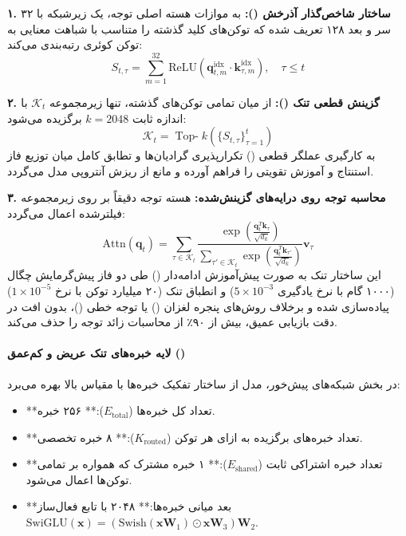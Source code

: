 \textbf{۱. ساختار شاخص‌گذار آذرخش ():}
به موازات هسته اصلی توجه، یک زیرشبکه با ۳۲ سر و بعد ۱۲۸ تعریف شده که توکن‌های کلید گذشته را متناسب با شباهت معنایی به توکن کوئری رتبه‌بندی می‌کند:
\begin{equation}
    S_{t, \tau} = \sum_{m=1}^{32} \text{ReLU}\left( \mathbf{q}_{t, m}^{\text{idx}} \cdot \mathbf{k}_{\tau, m}^{\text{idx}} \right), \quad \tau \le t
\end{equation}

\textbf{۲. گزینش قطعی تنک ():}
از میان تمامی توکن‌های گذشته، تنها زیرمجموعه $\mathcal{K}_t$ با اندازه ثابت $k=2048$ برگزیده می‌شود:
\begin{equation}
    \mathcal{K}_t = \operatorname{Top-}k\left( \{ S_{t, \tau} \}_{\tau=1}^t \right)
\end{equation}
به کارگیری عملگر قطعی  () تکرارپذیری گرادیان‌ها و تطابق کامل میان توزیع فاز استنتاج و آموزش تقویتی را فراهم آورده و مانع از ریزش آنتروپی مدل می‌گردد.

\textbf{۳. محاسبه توجه روی درایه‌های گزینش‌شده:}
هسته توجه دقیقاً بر روی زیرمجموعه فیلترشده اعمال می‌گردد:
\begin{equation}
    \text{Attn}(\mathbf{q}_t) = \sum_{\tau \in \mathcal{K}_t} \frac{\exp\left( \frac{\mathbf{q}_t^T \mathbf{k}_\tau}{\sqrt{d_k}} \right)}{\sum_{\tau' \in \mathcal{K}_t} \exp\left( \frac{\mathbf{q}_t^T \mathbf{k}_{\tau'}}{\sqrt{d_k}} \right)} \mathbf{v}_\tau
\end{equation}
این ساختار تنک به صورت پیش‌آموزش ادامه‌دار () طی دو فاز پیش‌گرمایش چگال (۱۰۰۰ گام با نرخ یادگیری $5\times 10^{-3}$) و انطباق تنک (۲۰ میلیارد توکن با نرخ $1\times 10^{-5}$) پیاده‌سازی شده و برخلاف روش‌های پنجره لغزان () یا توجه خطی ()، بدون افت در دقت بازیابی عمیق، بیش از ۹۰٪ از محاسبات زائد توجه را حذف می‌کند.

\paragraph*{لایه خبره‌های تنک عریض و کم‌عمق ()}
در بخش شبکه‌های پیش‌خور، مدل از ساختار تفکیک خبره‌ها با مقیاس بالا بهره می‌برد:
\begin{itemize}
    \item **تعداد کل خبره‌ها ($E_{\text{total}}$):** ۲۵۶ خبره.
    \item **تعداد خبره‌های برگزیده به ازای هر توکن ($K_{\text{routed}}$):** ۸ خبره تخصصی.
    \item **تعداد خبره اشتراکی ثابت ($E_{\text{shared}}$):** ۱ خبره مشترک که همواره بر تمامی توکن‌ها اعمال می‌شود.
    \item **بعد میانی خبره‌ها:** ۲۰۴۸ با تابع فعال‌ساز $\text{SwiGLU}(\mathbf{x}) = (\text{Swish}(\mathbf{x}\mathbf{W}_1) \odot \mathbf{x}\mathbf{W}_3)\mathbf{W}_2$.
\end{itemize}

